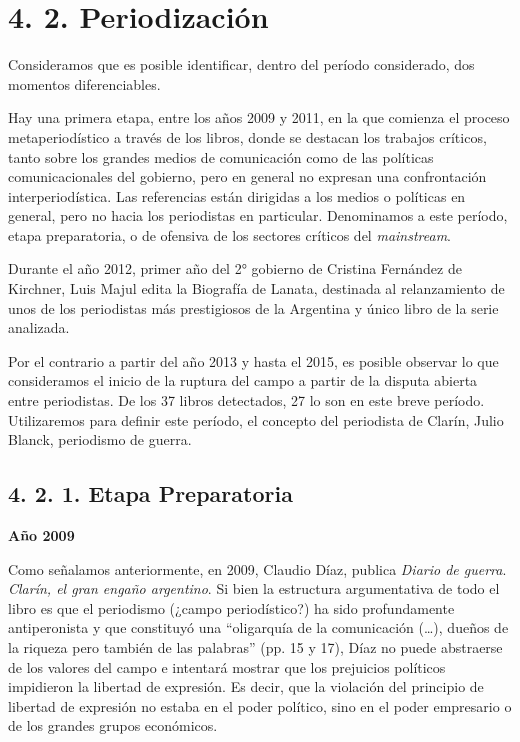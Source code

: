 {\section{4. 2. Periodización}

Consideramos que es posible identificar, dentro del período considerado, dos momentos diferenciables.

Hay una primera etapa, entre los años 2009 y 2011, en la que comienza el proceso metaperiodístico a través de los libros, donde se destacan los trabajos críticos, tanto sobre los grandes medios de comunicación como de las políticas comunicacionales del gobierno, pero en general no expresan una confrontación interperiodística. Las referencias están dirigidas a los medios o políticas en general, pero no hacia los periodistas en particular. Denominamos a este período, etapa preparatoria, o de ofensiva de los sectores críticos del \emph{mainstream}.

Durante el año 2012, primer año del 2° gobierno de Cristina Fernández de Kirchner, Luis Majul edita la Biografía de Lanata, destinada al relanzamiento de unos de los periodistas más prestigiosos de la Argentina y único libro de la serie analizada.

Por el contrario a partir del año 2013 y hasta el 2015, es posible observar lo que consideramos el inicio de la ruptura del campo a partir de la disputa abierta entre periodistas. De los 37 libros detectados, 27 lo son en este breve período. Utilizaremos para definir este período, el concepto del periodista de Clarín, Julio Blanck, periodismo de guerra.

\subsection{4. 2. 1. Etapa Preparatoria}

\textbf{Año 2009}

Como señalamos anteriormente, en 2009, Claudio Díaz, publica \emph{Diario de guerra}. \emph{Clarín, el gran engaño argentino}. Si bien la estructura argumentativa de todo el libro es que el periodismo (¿campo periodístico?) ha sido profundamente antiperonista y que constituyó una ``oligarquía de la comunicación (\ldots), dueños de la riqueza pero también de las palabras'' (pp. 15 y 17), Díaz no puede abstraerse de los valores del campo e intentará mostrar que los prejuicios políticos impidieron la libertad de expresión. Es decir, que la violación del principio de libertad de expresión no estaba en el poder político, sino en el poder empresario o de los grandes grupos económicos.

}
